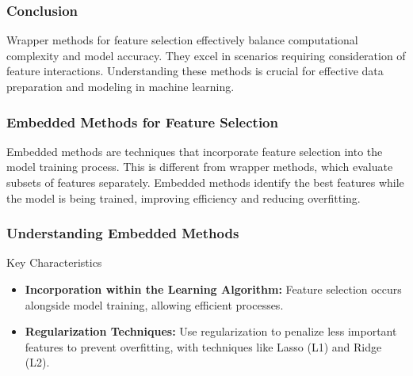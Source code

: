 \documentclass[aspectratio=169]{beamer}
\begin{document}
\begin{frame}[fragile]
  \frametitle{Conclusion}
  Wrapper methods for feature selection effectively balance computational complexity and model accuracy. They excel in scenarios requiring consideration of feature interactions. Understanding these methods is crucial for effective data preparation and modeling in machine learning.
\end{frame}

\begin{frame}[fragile]
    \frametitle{Embedded Methods for Feature Selection}
    Embedded methods are techniques that incorporate feature selection into the model training process. This is different from wrapper methods, which evaluate subsets of features separately. Embedded methods identify the best features while the model is being trained, improving efficiency and reducing overfitting.
\end{frame}

\begin{frame}[fragile]
    \frametitle{Understanding Embedded Methods}
    \begin{block}{Key Characteristics}
        \begin{itemize}
            \item \textbf{Incorporation within the Learning Algorithm:} 
                Feature selection occurs alongside model training, allowing efficient processes.
                
            \item \textbf{Regularization Techniques:} 
                Use regularization to penalize less important features to prevent overfitting, with techniques like Lasso (L1) and Ridge (L2).
        \end{itemize}
    \end{block}
\end{frame}
\end{document}
